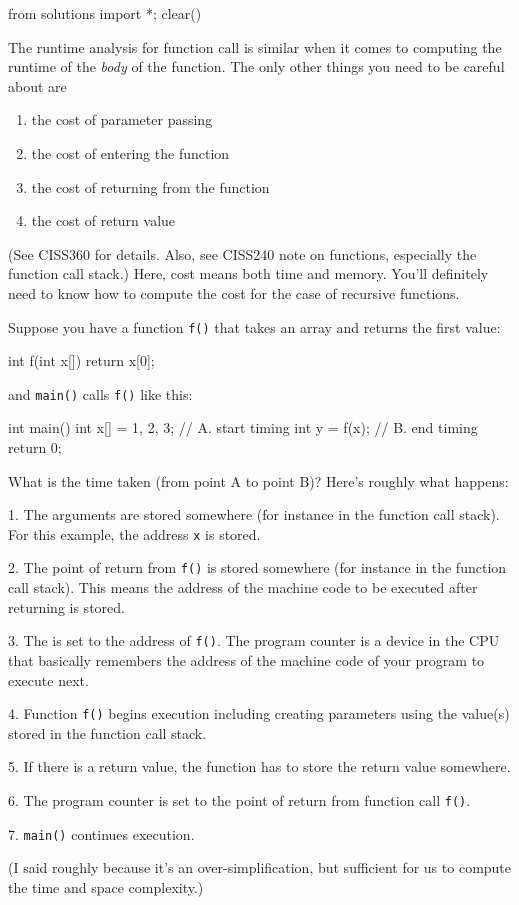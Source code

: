 \begin{python0}
from solutions import *; clear()
\end{python0}

The runtime analysis for function call is similar when it comes to
computing the runtime of the \textit{body} of the function.
The only other things you need to be careful about are
\begin{enumerate}[nosep]
\item the cost of parameter passing
\item the cost of entering the function
\item the cost of returning from the function
\item the cost of return value
\end{enumerate}
(See CISS360 for details.
Also, see CISS240 note on functions, especially the function call stack.)
Here, cost means both time and memory.
You'll definitely need to know how to compute the cost for the case of
recursive functions.

Suppose you have a function \verb!f()!
that takes an array and returns the first value:
\begin{console}
int f(int x[])
{
    return x[0];
}
\end{console}
and \verb!main()! calls \verb!f()! like this:
\begin{console}
int main()
{
    int x[] = {1, 2, 3};
    // A. start timing
    int y = f(x);
    // B. end timing
    return 0;
}
\end{console}
What is the time taken (from point A to point B)?
Here's roughly what happens:
\begin{tightlist}
\item[1.] The arguments are stored somewhere (for instance in the function call stack). For this example, the address \verb!x! is stored.
\item[2.] The point of return from \verb!f()! is stored somewhere (for instance in the function call stack).
This means the address of the machine code to be executed after returning
is stored.
\item[3.] The  is set to the address of \verb!f()!.
  The program counter is a device in the CPU that basically remembers
  the address of the machine code of your program to execute next.
\item[4.]
  Function \verb!f()! begins execution including
  creating parameters using the value(s) stored in the
  function call stack.
\item[5.] 
  If there is a return value, the function has to store
  the return value somewhere.
\item[6.]
  The program counter is set to the point of return from
  function call \verb!f()!.
\item[7.]
  \verb!main()! continues execution.
\end{tightlist}
(I said roughly because it's an over-simplification, but sufficient for us to
compute the time and space complexity.)

